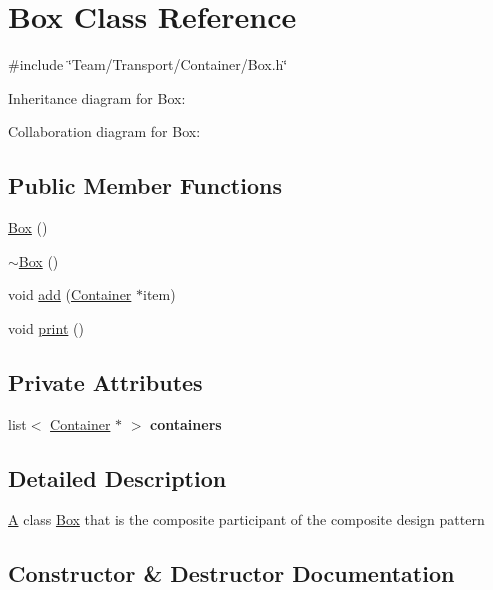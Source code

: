 \hypertarget{classBox}{}\section{Box Class Reference}
\label{classBox}


{\ttfamily \#include \char`\"{}Team/\+Transport/\+Container/\+Box.\+h\char`\"{}}



Inheritance diagram for Box\+:


Collaboration diagram for Box\+:
\subsection*{Public Member Functions}
\begin{DoxyCompactItemize}
\item 
\hyperlink{classBox_aca78d7db44972bfa78d46b7bbc8796f6}{Box} ()
\item 
\hyperlink{classBox_a6a5e09398e85d602a046b429062fb9c2}{$\sim$\+Box} ()
\item 
void \hyperlink{classBox_ab556d9a17e15a4a23d7f0950799f1525}{add} (\hyperlink{classContainer}{Container} $\ast$item)
\item 
void \hyperlink{classBox_a7f9cef3d9324289ae0fb4ec1aa50db9d}{print} ()
\end{DoxyCompactItemize}
\subsection*{Private Attributes}
\begin{DoxyCompactItemize}
\item 
\mbox{\label{classBox_a7c5f3f2e698b7c351d94e7d14f1c57c9}} 
list$<$ \hyperlink{classContainer}{Container} $\ast$ $>$ {\bfseries containers}
\end{DoxyCompactItemize}


\subsection{Detailed Description}
\hyperlink{classA}{A} class \hyperlink{classBox}{Box} that is the composite participant of the composite design pattern 

\subsection{Constructor \& Destructor Documentation}
\mbox{\label{classBox_aca78d7db44972bfa78d46b7bbc8796f6}} 
